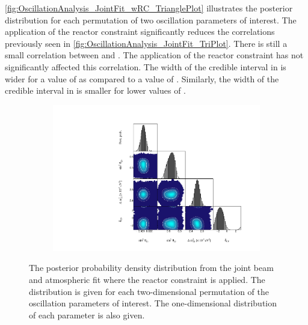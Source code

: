 \autoref{fig:OscillationAnalysis_JointFit_wRC_TrianglePlot} illustrates the posterior distribution for each permutation of two oscillation parameters of interest. The application of the reactor constraint significantly reduces the correlations previously seen in \autoref{fig:OscillationAnalysis_JointFit_TriPlot}. There is still a small correlation between  and . The application of the reactor constraint has not significantly affected this correlation. The width of the \quickmath{1\sigma} credible interval in  is wider for a value of  as compared to a value of . Similarly, the width of the \quickmath{1\sigma} credible interval in  is smaller for lower values of .

\begin{figure}[h]
  \begin{subfigure}[t]{0.98\textwidth}
    \includegraphics[width=\textwidth, trim={0mm 0mm 0mm 0mm}, clip,page=1]{Figures/OA/JointFit_wRC/Contours_1D_wRC_UnSmeared_CredibleInterval_TrianglePlot.pdf}
  \end{subfigure}
  \caption{The posterior probability density distribution from the joint beam and atmospheric fit where the reactor constraint is applied. The distribution is given for each two-dimensional permutation of the oscillation parameters of interest. The one-dimensional distribution of each parameter is also given.}
  \label{fig:OscillationAnalysis_JointFit_wRC_TrianglePlot}
\end{figure}

